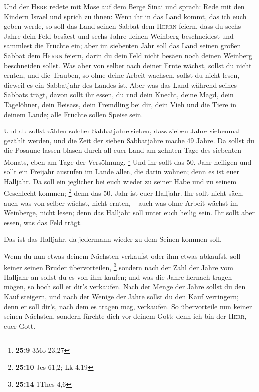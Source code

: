  Und der \textsc{Herr} redete mit Mose auf dem Berge Sinai
und sprach:  Rede mit den Kindern Israel und sprich zu
ihnen: Wenn ihr in das Land kommt, das ich euch geben werde, so soll das
Land seinen Sabbat dem \textsc{Herrn} feiern,  dass du
sechs Jahre dein Feld besäest und sechs Jahre deinen Weinberg
beschneidest und sammlest die Früchte ein;  aber im
siebenten Jahr soll das Land seinen großen Sabbat dem \textsc{Herrn}
feiern, darin du dein Feld nicht besäen noch deinen Weinberg beschneiden
sollst.  Was aber von selber nach deiner Ernte wächst,
sollst du nicht ernten, und die Trauben, so ohne deine Arbeit wachsen,
sollst du nicht lesen, dieweil es ein Sabbatjahr des Landes ist.
 Aber was das Land während seines Sabbats trägt, davon
sollt ihr essen, du und dein Knecht, deine Magd, dein Tagelöhner, dein
Beisass, dein Fremdling bei dir,  dein Vieh und die Tiere
in deinem Lande; alle Früchte sollen Speise sein.

 Und du sollst zählen solcher Sabbatjahre sieben, dass
sieben Jahre siebenmal gezählt werden, und die Zeit der sieben
Sabbatjahre mache 49 Jahre.  Da sollst du die Posaune
lassen blasen durch all euer Land am zehnten Tage des siebenten Monats,
eben am Tage der Versöhnung. \footnote{\textbf{25:9} 3Mo 23,27}
 Und ihr sollt das 50. Jahr heiligen und sollt ein
Freijahr ausrufen im Lande allen, die darin wohnen; denn es ist euer
Halljahr. Da soll ein jeglicher bei euch wieder zu seiner Habe und zu
seinem Geschlecht kommen; \footnote{\textbf{25:10} Jes 61,2; Lk 4,19}
 denn das 50. Jahr ist euer Halljahr. Ihr sollt nicht
säen, -- auch was von selber wächst, nicht ernten, -- auch was ohne
Arbeit wächst im Weinberge, nicht lesen;  denn das
Halljahr soll unter euch heilig sein. Ihr sollt aber essen, was das Feld
trägt.

 Das ist das Halljahr, da jedermann wieder zu dem Seinen
kommen soll.

 Wenn du nun etwas deinem Nächsten verkaufst oder ihm
etwas abkaufst, soll keiner seinen Bruder übervorteilen, \footnote{\textbf{25:14}
  1Thes 4,6}  sondern nach der Zahl der Jahre vom
Halljahr an sollst du es von ihm kaufen; und was die Jahre hernach
tragen mögen, so hoch soll er dir's verkaufen.  Nach der
Menge der Jahre sollst du den Kauf steigern, und nach der Wenige der
Jahre sollst du den Kauf verringern; denn er soll dir's, nach dem es
tragen mag, verkaufen.  So übervorteile nun keiner seinen
Nächsten, sondern fürchte dich vor deinem Gott; denn ich bin der
\textsc{Herr}, euer Gott.

